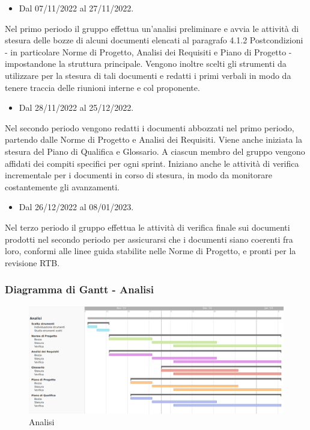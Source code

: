 \begin{itemize}
    \item Dal 07/11/2022 al 27/11/2022.
\end{itemize}
Nel primo periodo il gruppo effettua un’analisi preliminare e avvia le attività di stesura delle bozze di alcuni documenti elencati al paragrafo 4.1.2 Postcondizioni - in particolare Norme di Progetto, Analisi dei Requisiti e Piano di Progetto - impostandone la struttura principale. Vengono inoltre scelti gli strumenti da utilizzare per la stesura di tali documenti e redatti i primi verbali in modo da tenere traccia delle riunioni interne e col proponente.

\begin{itemize}
    \item Dal 28/11/2022 al 25/12/2022.
\end{itemize}
Nel secondo periodo vengono redatti i documenti abbozzati nel primo periodo, partendo dalle Norme di Progetto e Analisi dei Requisiti. Viene anche iniziata la stesura del Piano di Qualifica e Glossario.
A ciascun membro del gruppo vengono affidati dei compiti specifici per ogni sprint. Iniziano anche le attività di verifica incrementale per i documenti in corso di stesura, in modo da monitorare costantemente gli avanzamenti.

\begin{itemize}
    \item Dal 26/12/2022 al 08/01/2023.
\end{itemize}
Nel terzo periodo il gruppo effettua le attività di verifica finale sui documenti prodotti nel secondo periodo per assicurarsi che i documenti siano coerenti fra loro, conformi alle linee guida stabilite nelle Norme di Progetto, e pronti per la revisione RTB.

\subsubsection{Diagramma di Gantt - Analisi}

\begin{figure}[H]
\centering
\includegraphics[width=\textwidth]{img/4_analisi.png}
\caption{Analisi}
\end{figure}


